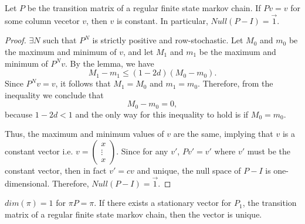 \documentclass[a4paper]{article}
\begin{document}
\begin{corollary}
  Let $P$ be the transition matrix of a regular finite state markov chain. If  $Pv = v$ for some column vecetor  $v$, then  $v$ is constant. In particular,  $Null(P-I)=\vec{1}$. 

  \noindent\hrulefill

  \begin{proof}
$\exists N$ such that $P^N$ is strictly positive and row-stochastic. Let $M_0$ and $ m_0$ be the maximum and minimum of $v$, and let $M_1$ and $m_1$ be the maximum and minimum of $P^N v$. By the lemma, we have
\[
M_1 - m_1 \leq (1 - 2d)(M_0 - m_0).
\]
Since $P^N v = v$, it follows that $M_1 = M_0$ and $m_1 = m_0$. Therefore, from the inequality we conclude that
\[
M_0 - m_0 = 0,
\]
because $1 - 2d < 1$ and the only way for this inequality to hold is if $M_0 = m_0$.

Thus, the maximum and minimum values of $v$ are the same, implying that $v$ is a constant vector i.e. $v =\begin{pmatrix} x \\ \vdots\\x \end{pmatrix}$. Since for any $v'$, $Pv' = v'$  where $v'$ must be the constant vector, then in fact  $v' = cv$ and unique, the null space of $P - I$ is one-dimensional. Therefore, $Null(P - I) = \vec{1}$.
  \end{proof}
\end{corollary}

\begin{lemma}
  $dim(\pi) = 1$ for $\pi P = \pi$. If there exists a stationary vector for $P_1$, the transition matrix of a regular finite state markov chain, then the vector is unique.
\end{lemma}
\end{document}
